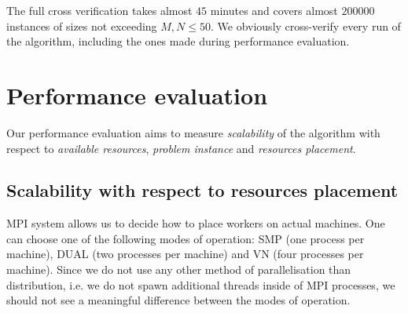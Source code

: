 The full cross verification takes almost $45$ minutes and covers almost $200000$ instances of sizes not exceeding $M, N \leq 50$.
We obviously cross-verify every run of the algorithm, including the ones made during performance evaluation.

\section*{Performance evaluation}

Our performance evaluation aims to measure \emph{scalability} of the algorithm with respect to \emph{available resources}, \emph{problem instance} and \emph{resources placement}.

\subsection*{Scalability with respect to resources placement}

MPI system allows us to decide how to place workers on actual machines.
One can choose one of the following modes of operation: SMP (one process per machine), DUAL (two processes per machine) and VN (four processes per machine).
Since we do not use any other method of parallelisation than distribution, i.e. we do not spawn additional threads inside of MPI processes, we should not see a meaningful difference between the modes of operation.

